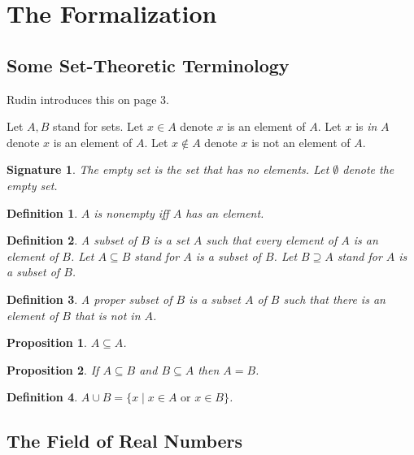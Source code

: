 \documentclass{article}
\newenvironment{forthel}{\begin{leftbar}}{\end{leftbar}}
\newtheorem{definition}{Definition}
\newtheorem{signature}{Signature}
\newtheorem{proposition}{Proposition}
\begin{document}
\section{The Formalization}
\subsection{Some Set-Theoretic Terminology}

Rudin introduces this on page 3.

\begin{forthel}
Let $A,B$ stand for sets.
Let $x \in A$ denote $x$ is an element of $A$.
Let $x$ is \emph{in} $A$ denote $x$ is an element of $A$.
Let $x \notin A$ denote $x$ is not an element of $A$.

\begin{signature} The \emph{empty set} is the set that has no elements.
Let $\emptyset$ denote the empty set.
\end{signature}

\begin{definition} $A$ is \emph{nonempty} iff $A$ has an element.
\end{definition}

\begin{definition} A subset of $B$ is a set $A$ such that every element 
of $A$ is an element of $B$. 
Let $A \subseteq B$ stand for $A$ is a subset of $B$.
Let $B \supseteq A$ stand for $A$ is a subset of $B$.
\end{definition}

\begin{definition} A \emph{proper subset} of $B$ is a subset $A$ of $B$ such that there is an element of $B$ that is not in $A$.
\end{definition}

\begin{proposition} $A \subseteq A$. \end{proposition}

\begin{proposition} If $A \subseteq B$ and $B \subseteq A$ then $A = B$. \end{proposition}


\begin{definition} $A \cup B = \{x \mid x \in A \text{ or } x \in B\}$. \end{definition}

\end{forthel}

\subsection{The Field of Real Numbers}
\end{document}
